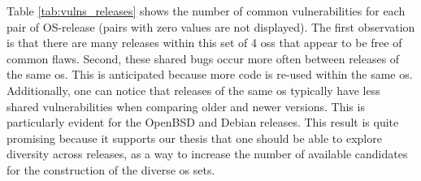 Table \ref{tab:vulns_releases} shows the number of common vulnerabilities for each pair of OS-release (pairs with zero values are not displayed). 
The first observation is that there are many releases within this set of 4 \glspl{os} that appear to be free of common flaws. 
Second, these shared bugs occur more often between releases of the same \gls{os}. 
This is anticipated because more code is re-used within the same \gls{os}.
Additionally, one can notice that releases of the same \gls{os} typically have less shared vulnerabilities when comparing older and newer versions. 
This is particularly evident for the OpenBSD and Debian releases. 
This result is quite promising because it supports our thesis that one should be able to explore diversity across releases, as a way to increase the number of available candidates for the construction of the diverse \gls{os} sets.





